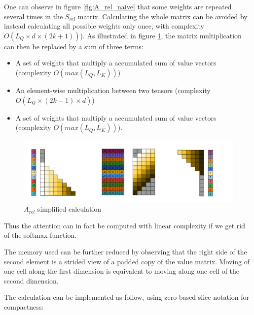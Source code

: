 One can observe in figure \ref{fig:A_rel_naive} that some weights are repeated several times in the
$S_{rel}$ matrix. Calculating the whole matrix can be avoided by
instead calculating all possible weights only once, with complexity
$O \left(L_Q\times d\times(2k+1)\right)$). As illustrated in figure \ref{fig:A_rel_linear}, the matrix multiplication can then be
replaced by a sum of three terms:

\begin{itemize}
\item A set of weights that multiply a
accumulated sum of value vectors (complexity $O(max(L_Q, L_K))$)
\item An
element-wise multiplication between two tensors (complexity
$O(L_Q\times (2k-1) \times d)$)
\item A set of weights that multiply a
accumulated sum of value vectors (complexity $O(max(L_Q, L_K))$).
\end{itemize}

\begin{figure}
\centering
\includegraphics[width=0.9\linewidth]{images/S_rel_V_detailed.png}
\caption{$A_{rel}$ simplified calculation}
\label{fig:A_rel_linear}
\end{figure}

Thus the attention can in fact be computed with linear complexity if we
get rid of the softmax function.

The memory used can be further reduced by observing that the right side
of the second element is a strided view of a padded copy of the value
matrix. Moving of one cell along the first dimension is equivalent to
moving along one cell of the second dimension.

The calculation can be implemented as follow, using zero-based slice
notation for compactness:

